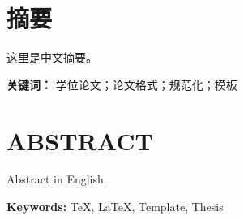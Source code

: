 \chapter*{摘\quad 要}

这里是中文摘要。

{\songti\bfseries\textbf{关键词：}} 学位论文；论文格式；规范化；模板


\newpage

\chapter*{ABSTRACT}

Abstract in English.

{\bfseries \textbf{Keywords:}} \TeX, \LaTeX, Template, Thesis